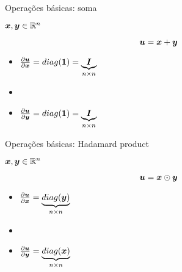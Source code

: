 \documentclass[10pt]{beamer}
\begin{document}
\begin{frame}{Operações básicas: soma}
\Large{
$\bm{x},\bm{y} \in \mathbb{R}^{n}$

\vspace{0.3 cm}

\begin{equation*}
\bm{u} = \bm{x} + \bm{y}
\end{equation*}

\vspace{0.3 cm}
\begin{itemize}
\item $\frac{\partial \bm{u}}{\partial \bm{x}} = diag(\bm{1}) = \underbrace{\bm{I}}_{\tiny{n \times n}}$
\item[]
\item $\frac{\partial \bm{u}}{\partial \bm{y}} = diag(\bm{1}) = \underbrace{\bm{I}}_{\tiny{n \times n}}$
\end{itemize}
}
\end{frame}

\begin{frame}{Operações básicas: Hadamard product}
\Large{
$\bm{x},\bm{y} \in \mathbb{R}^{n}$

\vspace{0.3 cm}

\begin{equation*}
\bm{u} = \bm{x} \odot \bm{y}
\end{equation*}


\vspace{0.3 cm}
\begin{itemize}
\item $\frac{\partial \bm{u}}{\partial \bm{x}} = \underbrace{diag(\bm{y})}_{\tiny{n \times n}}$
\item[]
\item $\frac{\partial \bm{u}}{\partial \bm{y}} = \underbrace{diag(\bm{x})}_{\tiny{n \times n}}$
\end{itemize}
}
\end{frame}
\end{document}
